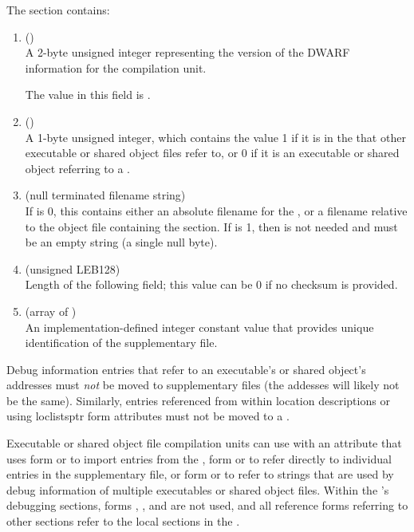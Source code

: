 The \dotdebugsup{} section contains:
\begin{enumerate}[1. ]
\item \HFNversion{} (\HFTuhalf) \\
A 2-byte unsigned integer representing the version of the DWARF
information for the compilation unit. 

The value in this field is \versiondotdebugsup.

\item \HFNissupplementary{} (\HFTubyte) \\
A 1-byte unsigned integer, which contains the value 1 if it is
in the  that other executable or 
shared object files refer to, or 0 if it is an executable or shared object 
referring to a .

\item \HFNsupfilename{} (null terminated filename string) \\
If \HFNissupplementary{} is 0, this contains either an absolute 
filename for the , or a filename 
relative to the object file containing the \dotdebugsup{} section.  
If \HFNissupplementary{} is 1, then \HFNsupfilename{}
is not needed and must be an empty string (a single null byte).

\item \HFNsupchecksumlen{} (unsigned LEB128) \\
Length of the following \HFNsupchecksum{} field; 
this value can be 0 if no checksum is provided.

\item \HFNsupchecksum{} (array of \HFTubyte) \\
An implementation-defined integer constant value that
provides unique identification of the supplementary file.

\end{enumerate}

Debug information entries that refer to an executable's or shared
object's addresses must \emph{not} be moved to supplementary files 
(the addesses will likely not be the same). Similarly,
entries referenced from within location descriptions or using loclistsptr
form attributes must not be moved to a .

Executable or shared object file compilation units can use
\DWTAGimportedunit{} with an
\DWATimport{} attribute that uses form \DWFORMrefsupfour{} or \DWFORMrefsupeight{} 
to import entries from the , 
\bb
form \DWFORMrefsupfour{} or \DWFORMrefsupeight{} 
\eb
to refer directly to individual entries in the supplementary file, or
\bb
form \DWFORMstrpsup{} or \DWFORMstrpsupeight{} 
\eb
to refer to strings that are used by debug information of multiple
executables or shared object files.  Within the 's
debugging sections, forms \DWFORMrefsupfour{}, 
\bb
\DWFORMrefsupeight{}, \DWFORMstrpsup{} and \DWFORMstrpsupeight{}
\eb
are not used, and all reference forms referring to \db other sections
refer to the local sections in the .

